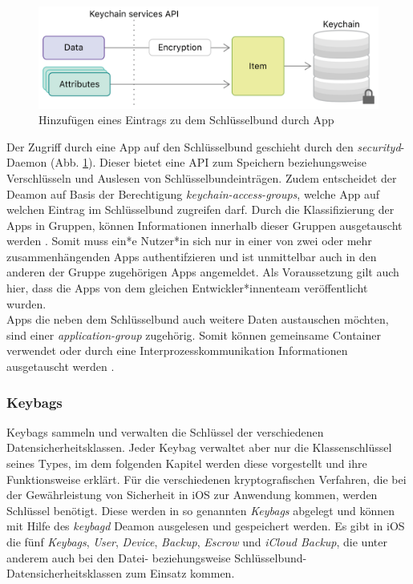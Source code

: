 \begin{figure}[h]
	\centering
  		\includegraphics[width=1\textwidth]{../images/keychain-api-example}
		\caption{Hinzufügen eines Eintrags zu dem Schlüsselbund durch App \cite{apple2020keychain_items}}
		\label{fig:add-entry-to-keychain}
\end{figure}

Der Zugriff durch eine App auf den Schlüsselbund geschieht durch den \textit{securityd}-Daemon (Abb. \ref{fig:add-entry-to-keychain}). Dieser bietet eine API zum Speichern beziehungsweise Verschlüsseln und Auslesen von Schlüsselbundeinträgen. Zudem  entscheidet der Deamon auf Basis der Berechtigung \textit{keychain-access-groups}, welche App auf welchen Eintrag im Schlüsselbund zugreifen darf. Durch die Klassifizierung der Apps in Gruppen, können Informationen innerhalb dieser Gruppen ausgetauscht werden \cite{apple2020keychain_item_groups}. Somit muss ein*e Nutzer*in sich nur in einer von zwei oder mehr zusammenhängenden Apps authentifzieren und ist unmittelbar auch in den anderen der Gruppe zugehörigen Apps angemeldet. Als Voraussetzung gilt auch hier, dass die Apps von dem gleichen Entwickler*innenteam veröffentlicht wurden. \\
Apps die neben dem Schlüsselbund auch weitere Daten austauschen möchten, sind einer \textit{application-group} zugehörig.  Somit können gemeinsame Container verwendet oder durch eine Interprozesskommunikation Informationen ausgetauscht werden \cite{apple2020keychain_application_groups}. 


\subsubsection{Keybags}
Keybags sammeln und verwalten die Schlüssel der verschiedenen Datensicherheitsklassen. Jeder Keybag verwaltet aber
nur die Klassenschlüssel seines Types, im dem folgenden Kapitel werden diese vorgestellt und ihre 
Funktionsweise erklärt. \cite{apple2020}
Für die verschiedenen kryptografischen Verfahren, die bei der Gewährleistung von Sicherheit in iOS zur Anwendung kommen, werden Schlüssel benötigt. Diese werden in so genannten \textit{Keybags} abgelegt und können mit Hilfe des \textit{keybagd} Deamon ausgelesen und gespeichert werden.
Es gibt in iOS die fünf \textit{Keybags}, \textit{User}, \textit{Device}, \textit{Backup}, \textit{Escrow} und \textit{iCloud Backup}, die unter anderem auch bei den Datei- beziehungsweise  Schlüsselbund-Datensicherheitsklassen  zum Einsatz kommen.\cite{apple2020}

